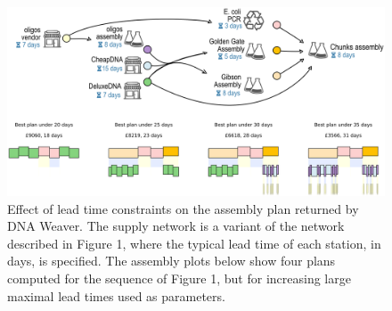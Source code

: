 \begin{figure}[!tpb]
  \includegraphics[width=\textwidth]{figures/figure_4_time_limit.eps}
  \caption{Effect of lead time constraints on the assembly plan returned by DNA Weaver. The supply network is a variant of the network described in Figure 1, where the typical lead time of each station, in days, is specified. The assembly plots below show four plans computed for the sequence of Figure 1, but for increasing large maximal lead times used as parameters.} 
  \label{lead_time}
\end{figure}


